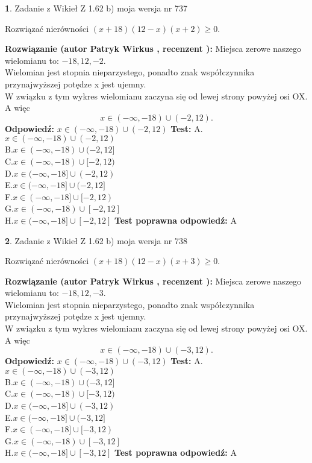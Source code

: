 \documentclass[12pt, a4paper]{article}
\theoremstyle{definition} %
\newtheorem{zad}{}
\newcommand{\zadStart}[1]{\begin{zad}#1\newline}
\newcommand{\zadStop}{\end{zad}}
\newcommand{\rozwStart}[2]{\noindent \textbf{Rozwiązanie (autor #1 , recenzent #2): }\newline}
\newcommand{\rozwStop}{\newline}
\newcommand{\odpStart}{\noindent \textbf{Odpowiedź:}\newline}
\newcommand{\odpStop}{\newline}
\newcommand{\testStart}{\noindent \textbf{Test:}\newline}
\newcommand{\testStop}{\newline}
\newcommand{\kluczStart}{\noindent \textbf{Test poprawna odpowiedź:}\newline}
\newcommand{\kluczStop}{\newline}
\begin{document}
\zadStart{Zadanie z Wikieł Z 1.62 b) moja wersja nr 737}

Rozwiązać nierówności $(x+18)(12-x)(x+2)\ge0$.
\zadStop
\rozwStart{Patryk Wirkus}{}
Miejsca zerowe naszego wielomianu to: $-18, 12, -2$.\\
Wielomian jest stopnia nieparzystego, ponadto znak współczynnika przy\linebreak najwyższej potędze x jest ujemny.\\ W związku z tym wykres wielomianu zaczyna się od lewej strony powyżej osi OX. A więc $$x \in (-\infty,-18) \cup (-2,12).$$
\rozwStop
\odpStart
$x \in (-\infty,-18) \cup (-2,12)$
\odpStop
\testStart
A.$x \in (-\infty,-18) \cup (-2,12)$\\
B.$x \in (-\infty,-18) \cup (-2,12]$\\
C.$x \in (-\infty,-18) \cup [-2,12)$\\
D.$x \in (-\infty,-18] \cup (-2,12)$\\
E.$x \in (-\infty,-18] \cup (-2,12]$\\
F.$x \in (-\infty,-18] \cup [-2,12)$\\
G.$x \in (-\infty,-18) \cup [-2,12]$\\
H.$x \in (-\infty,-18] \cup [-2,12]$
\testStop
\kluczStart
A
\kluczStop



\zadStart{Zadanie z Wikieł Z 1.62 b) moja wersja nr 738}

Rozwiązać nierówności $(x+18)(12-x)(x+3)\ge0$.
\zadStop
\rozwStart{Patryk Wirkus}{}
Miejsca zerowe naszego wielomianu to: $-18, 12, -3$.\\
Wielomian jest stopnia nieparzystego, ponadto znak współczynnika przy\linebreak najwyższej potędze x jest ujemny.\\ W związku z tym wykres wielomianu zaczyna się od lewej strony powyżej osi OX. A więc $$x \in (-\infty,-18) \cup (-3,12).$$
\rozwStop
\odpStart
$x \in (-\infty,-18) \cup (-3,12)$
\odpStop
\testStart
A.$x \in (-\infty,-18) \cup (-3,12)$\\
B.$x \in (-\infty,-18) \cup (-3,12]$\\
C.$x \in (-\infty,-18) \cup [-3,12)$\\
D.$x \in (-\infty,-18] \cup (-3,12)$\\
E.$x \in (-\infty,-18] \cup (-3,12]$\\
F.$x \in (-\infty,-18] \cup [-3,12)$\\
G.$x \in (-\infty,-18) \cup [-3,12]$\\
H.$x \in (-\infty,-18] \cup [-3,12]$
\testStop
\kluczStart
A
\kluczStop
\end{document}
